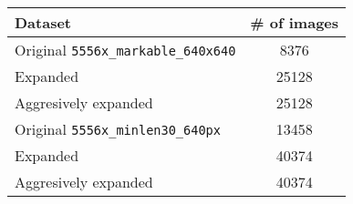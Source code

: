 \documentclass[border={15pt 1pt 5pt 1pt}, varwidth=38em]{standalone}
\begin{document}
\newcommand{\rpm}{\sbox0{$1$}\sbox2{$\scriptstyle\pm$}
  \raise\dimexpr(\ht0-\ht2)/2\relax\box2 }

\begin{table}[]
\centering
\begin{tabular}{l|c}
Dataset & \# of images \\ \hline
Original \verb!5556x_markable_640x640! & 8376 \\
Expanded & 25128 \\
Aggresively expanded & 25128 \\ \hline
Original \verb!5556x_minlen30_640px! & 13458 \\
Expanded & 40374 \\
Aggresively expanded & 40374 \\
\end{tabular}
\end{table}
\end{document}
